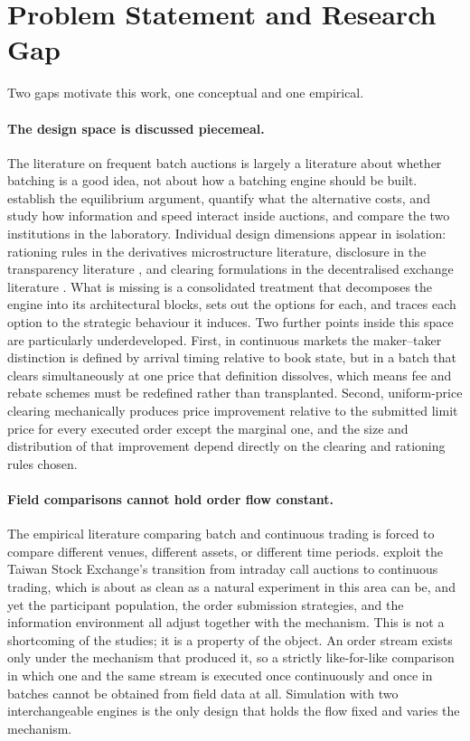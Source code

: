 \section{Problem Statement and Research Gap}
\label{sec:gap}

Two gaps motivate this work, one conceptual and one empirical.

\paragraph{The design space is discussed piecemeal.}
The literature on frequent batch auctions is largely a literature about
whether batching is a good idea, not about how a batching engine should
be built. \citet{budish2015hft} establish the equilibrium argument,
\citet{aquilina2022quantifying} quantify what the alternative costs,
\citet{zoican2021speed} and \citet{eibelshauser2022fba} study how
information and speed interact inside auctions, and
\citet{aldrich2020experiments} compare the two institutions in the
laboratory. Individual design dimensions appear in isolation: rationing
rules in the derivatives microstructure literature, disclosure in the
transparency literature \citep{madhavan1996transparency}, and clearing
formulations in the decentralised exchange literature
\citep{walther2021multitoken,ramsay2023speedex}. What is missing is a
consolidated treatment that decomposes the engine into its architectural
blocks, sets out the options for each, and traces each option to the
strategic behaviour it induces. Two further points inside this space are
particularly underdeveloped. First, in continuous markets the
maker--taker distinction is defined by arrival timing relative to book
state, but in a batch that clears simultaneously at one price that
definition dissolves, which means fee and rebate schemes must be
redefined rather than transplanted. Second, uniform-price clearing
mechanically produces price improvement relative to the submitted limit
price for every executed order except the marginal one, and the size and
distribution of that improvement depend directly on the clearing and
rationing rules chosen.

\paragraph{Field comparisons cannot hold order flow constant.}
The empirical literature comparing batch and continuous trading is
forced to compare different venues, different assets, or different time
periods. \citet{lee2026taiwan} exploit the Taiwan Stock Exchange's
transition from intraday call auctions to continuous trading, which is
about as clean as a natural experiment in this area can be, and yet the
participant population, the order submission strategies, and the
information environment all adjust together with the mechanism. This is
not a shortcoming of the studies; it is a property of the object. An
order stream exists only under the mechanism that produced it, so a
strictly like-for-like comparison in which one and the same stream is
executed once continuously and once in batches cannot be obtained from
field data at all. Simulation with two interchangeable engines is the
only design that holds the flow fixed and varies the mechanism.

